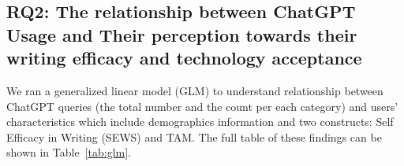 \documentclass[manuscript,screen,acmsmall]{acmart}
\begin{document}
    
    
    

    



\subsection{RQ2:  The relationship between ChatGPT Usage and Their perception towards their writing efficacy and technology acceptance}


We ran a generalized linear model (GLM) to understand relationship between ChatGPT queries (the total number and the count per each category) and users' characteristics which include demographics information and two constructs: Self Efficacy in Writing (SEWS) and TAM. The full table of these findings can be shown in Table~\ref{tab:glm}.
\end{document}
